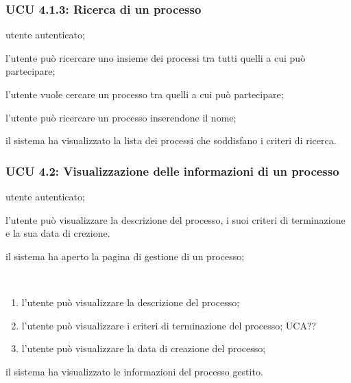 \subsubsection{UCU 4.1.3: Ricerca di un processo}
\begin{description}[leftmargin=0cm]
\item[Attori:] utente autenticato;
\item[Descrizione:] l'utente può ricercare uno insieme dei processi tra tutti quelli a cui può partecipare;
\item[Precondizione:] l'utente vuole cercare un processo tra quelli a cui può partecipare;
\item[Scenario principale:] l'utente può ricercare un processo inserendone il nome;
\item[Postcondizione:] il sistema ha visualizzato la lista dei processi che soddisfano i criteri di ricerca.
\end{description}

\subsubsection{UCU 4.2: Visualizzazione delle informazioni di un processo}
\begin{description}[leftmargin=0cm]
\item[Attori:] utente autenticato;
\item[Descrizione:] l'utente può visualizzare la descrizione del processo, i suoi criteri di terminazione e la sua data di crezione.
\item[Precondizione:] il sistema ha aperto la pagina di gestione di un processo;
\item[Scenario principale:]\
\begin{enumerate}
\item l'utente può visualizzare la descrizione del processo;
\item l'utente può visualizzare i criteri di terminazione del processo; UCA??
\item l'utente può visualizzare la data di creazione del processo;
\end{enumerate}
\item[Postcondizione:] il sistema ha visualizzato le informazioni del processo gestito.
\end{description}

